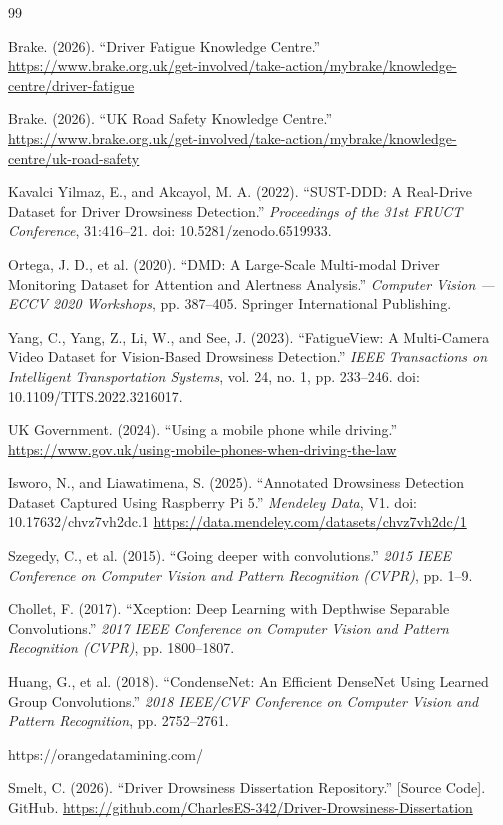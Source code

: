 \documentclass[12pt,a4paper]{report}
\begin{document}
\begin{thebibliography}{99}

Brake. (2026). ``Driver Fatigue Knowledge Centre.'' \url{https://www.brake.org.uk/get-involved/take-action/mybrake/knowledge-centre/driver-fatigue}

Brake. (2026). ``UK Road Safety Knowledge Centre.'' \url{https://www.brake.org.uk/get-involved/take-action/mybrake/knowledge-centre/uk-road-safety}

Kavalci Yilmaz, E., and Akcayol, M. A. (2022). ``SUST-DDD: A Real-Drive Dataset for Driver Drowsiness Detection.'' \textit{Proceedings of the 31st FRUCT Conference}, 31:416--21. doi: 10.5281/zenodo.6519933.

Ortega, J. D., et al. (2020). ``DMD: A Large-Scale Multi-modal Driver Monitoring Dataset for Attention and Alertness Analysis.'' \textit{Computer Vision — ECCV 2020 Workshops}, pp. 387--405. Springer International Publishing.

Yang, C., Yang, Z., Li, W., and See, J. (2023). ``FatigueView: A Multi-Camera Video Dataset for Vision-Based Drowsiness Detection.'' \textit{IEEE Transactions on Intelligent Transportation Systems}, vol. 24, no. 1, pp. 233--246. doi: 10.1109/TITS.2022.3216017.

UK Government. (2024). ``Using a mobile phone while driving.'' \url{https://www.gov.uk/using-mobile-phones-when-driving-the-law}

Isworo, N., and Liawatimena, S. (2025). ``Annotated Drowsiness Detection Dataset Captured Using Raspberry Pi 5.'' \textit{Mendeley Data}, V1. doi: 10.17632/chvz7vh2dc.1
\url{ https://data.mendeley.com/datasets/chvz7vh2dc/1}

Szegedy, C., et al. (2015). ``Going deeper with convolutions.'' \textit{2015 IEEE Conference on Computer Vision and Pattern Recognition (CVPR)}, pp. 1--9.

Chollet, F. (2017). ``Xception: Deep Learning with Depthwise Separable Convolutions.'' \textit{2017 IEEE Conference on Computer Vision and Pattern Recognition (CVPR)}, pp. 1800--1807.

Huang, G., et al. (2018). ``CondenseNet: An Efficient DenseNet Using Learned Group Convolutions.'' \textit{2018 IEEE/CVF Conference on Computer Vision and Pattern Recognition}, pp. 2752--2761.

https://orangedatamining.com/

Smelt, C. (2026). ``Driver Drowsiness Dissertation Repository.'' [Source Code]. GitHub. 
\url{https://github.com/CharlesES-342/Driver-Drowsiness-Dissertation}

\end{thebibliography}  
\end{document}
